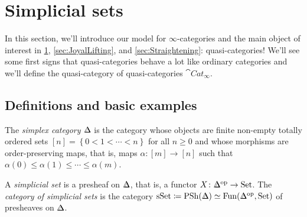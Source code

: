 \section{Simplicial sets}\label{sec:SimplicialSets}
In this section, we'll introduce our model for $\infty$-categories and the main object of interest in \cref{sec:SimplicialSets}, \cref{sec:JoyalLifting}, and \cref{sec:Straightening}: quasi-categories! We'll see some first signs that quasi-categories behave a lot like ordinary categories and we'll define the quasi-category of quasi-categories $\cat{Cat}_\infty$.
\subsection{Definitions and basic examples}
\begin{defi}\label{def:SimplicialSet}
	\begin{alphanumerate}
		\item The \emph{simplex category $\IDelta$} is the category whose objects are finite non-empty totally ordered sets $[n]=\left\{0<1<\dotsb<n\right\}$ for all $n\geqslant 0$ and whose morphisms are order-preserving maps, that is, maps $\alpha\colon [m]\rightarrow [n]$ such that $\alpha(0)\leqslant \alpha(1)\leqslant\dotsb\leqslant \alpha(m)$.\label{enum:SimplexCategory}
		\item A \emph{simplicial set} is a presheaf on $\IDelta$, that is, a functor $X\colon \IDelta^\op\rightarrow\cat{Set}$. The \emph{category of simplicial sets} is the category $\cat{sSet}\coloneqq \PSh(\IDelta)\simeq\Fun(\IDelta^\op,\cat{Set})$ of presheaves on $\IDelta$.\label{enum:SimplicialSet}
	\end{alphanumerate}
\end{defi}

